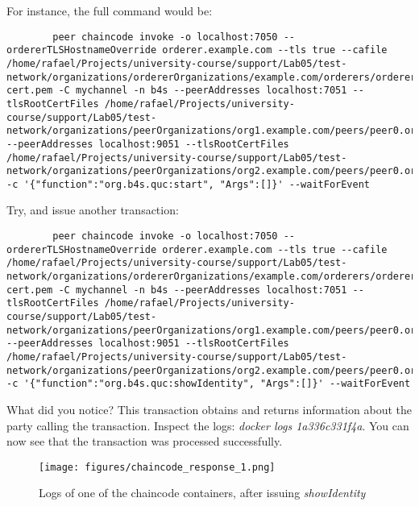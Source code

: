 \documentclass[12pt,a4paper]{article}
\theoremstyle{definition}
\begin{document}
    For instance, the full command would be:
    \begin{verbatim}
        peer chaincode invoke -o localhost:7050 --ordererTLSHostnameOverride orderer.example.com --tls true --cafile /home/rafael/Projects/university-course/support/Lab05/test-network/organizations/ordererOrganizations/example.com/orderers/orderer.example.com/msp/tlscacerts/tlsca.example.com-cert.pem -C mychannel -n b4s --peerAddresses localhost:7051 --tlsRootCertFiles /home/rafael/Projects/university-course/support/Lab05/test-network/organizations/peerOrganizations/org1.example.com/peers/peer0.org1.example.com/tls/ca.crt --peerAddresses localhost:9051 --tlsRootCertFiles /home/rafael/Projects/university-course/support/Lab05/test-network/organizations/peerOrganizations/org2.example.com/peers/peer0.org2.example.com/tls/ca.crt -c '{"function":"org.b4s.quc:start", "Args":[]}' --waitForEvent
    \end{verbatim}

    Try, and issue another transaction:
    \begin{verbatim}
        peer chaincode invoke -o localhost:7050 --ordererTLSHostnameOverride orderer.example.com --tls true --cafile /home/rafael/Projects/university-course/support/Lab05/test-network/organizations/ordererOrganizations/example.com/orderers/orderer.example.com/msp/tlscacerts/tlsca.example.com-cert.pem -C mychannel -n b4s --peerAddresses localhost:7051 --tlsRootCertFiles /home/rafael/Projects/university-course/support/Lab05/test-network/organizations/peerOrganizations/org1.example.com/peers/peer0.org1.example.com/tls/ca.crt --peerAddresses localhost:9051 --tlsRootCertFiles /home/rafael/Projects/university-course/support/Lab05/test-network/organizations/peerOrganizations/org2.example.com/peers/peer0.org2.example.com/tls/ca.crt -c '{"function":"org.b4s.quc:showIdentity", "Args":[]}' --waitForEvent
    \end{verbatim}

    What did you notice? This transaction obtains and returns information about the party calling the transaction. Inspect the logs: \emph{docker logs 1a336c331f4a}. You can now see that the transaction was processed successfully.

    \begin{figure}[h]
        \centering
        \texttt{[image: figures/chaincode\_response\_1.png]}
        \caption{Logs of one of the chaincode containers, after issuing \emph{showIdentity}}
        \label{fig:cr_1}
    \end{figure}
\end{document}
